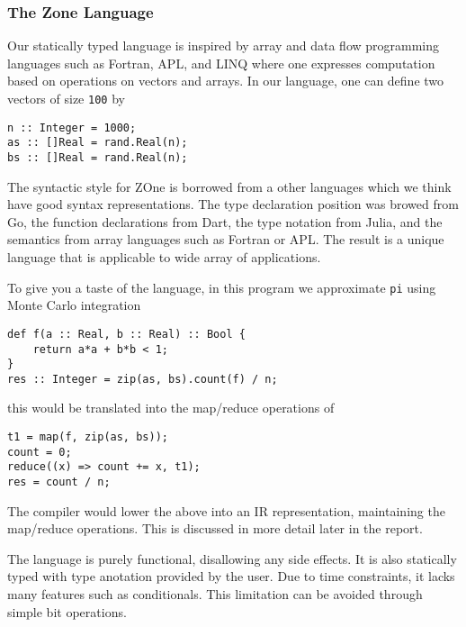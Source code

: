 \subsubsection{The Zone Language}
\label{sec:zonelang}

Our statically typed language is inspired by array and data flow
programming languages such as Fortran\cite{Fortran}, APL\cite{APL}, and
LINQ\cite{LINQ} where one expresses computation based on operations on
vectors and arrays. In our language, one can define two vectors of size
\texttt{100} by

\begin{verbatim}
n :: Integer = 1000;
as :: []Real = rand.Real(n);
bs :: []Real = rand.Real(n); 
\end{verbatim}


The syntactic style for ZOne is borrowed from a other languages
	which we think have good syntax representations.
The type declaration position was browed from Go\cite{golang},
	the function declarations from Dart\cite{dartlang},
	the type notation from Julia\cite{julialang},
	and the semantics from array languages such as Fortran\cite{Fortran} or APL\cite{APL}.
The result is a unique language that is applicable to wide array
	of applications.



To give you a taste of the language, in this program we approximate
\texttt{pi} using Monte Carlo integration

\begin{verbatim}
def f(a :: Real, b :: Real) :: Bool {
	return a*a + b*b < 1;
}
res :: Integer = zip(as, bs).count(f) / n;
\end{verbatim}

this would be translated into the map/reduce operations of

\begin{verbatim}
t1 = map(f, zip(as, bs));
count = 0;
reduce((x) => count += x, t1);
res = count / n;
\end{verbatim}

The compiler would lower the above into an IR representation,
maintaining the map/reduce operations. This is discussed 
in more detail later in the report.


The language is purely functional, disallowing any side effects.
It is also statically typed with type anotation provided by the user.
Due to time constraints, it lacks many features such as conditionals.
This limitation can be avoided through simple bit operations.


